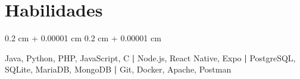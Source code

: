 \documentclass[10pt, letterpaper]{article}
\newenvironment{highlights}{
    \begin{itemize}[
        topsep=0.10 cm,
        parsep=0.10 cm,
        partopsep=0pt,
        itemsep=0pt,
        leftmargin=0.4 cm + 10pt
    ]
}{
    \end{itemize}
} %
\newenvironment{onecolentry}{
    \begin{adjustwidth}{
        0.2 cm + 0.00001 cm
    }{
        0.2 cm + 0.00001 cm
    }
}{
    \end{adjustwidth}
} %
\newenvironment{twocolentry}[2][]{
    \onecolentry
    \def\secondColumn{#2}
    \setcolumnwidth{\fill, 4.5 cm}
    \begin{paracol}{2}
}{
    \switchcolumn \raggedleft \secondColumn
    \end{paracol}
    \endonecolentry
} %
\let\hrefWithoutArrow\href
\renewcommand{\href}[2]{\hrefWithoutArrow{#1}{\ifthenelse{\equal{#2}{}}{ }{#2 }\raisebox{.15ex}{\footnotesize \faExternalLink*}}}
\begin{document}

                        




            


    
    \section{Habilidades}

        \begin{onecolentry}
            Java, Python, PHP, JavaScript, C\textbf{ | } Node.js, React Native, Expo\textbf{ | } PostgreSQL, SQLite, MariaDB, MongoDB\textbf{ | } Git, Docker, Apache, Postman
        \end{onecolentry}
    
\end{document}
